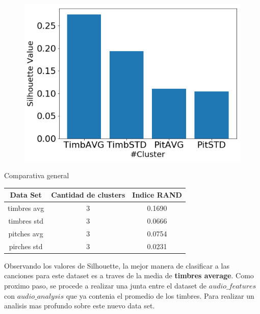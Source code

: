 \begin{figure}[H]
\includegraphics[width=\textwidth]{img/imagenes/jerarquico_AA/silhouette_avgstd.png}
\end{figure}
\begin{center}Comparativa general\end{center}

\begin{table}[H]
	\centering
	\begin{tabular}{ |c|c|c| }
		\hline
 		Data Set & Cantidad de clusters & Indice RAND\\
 		\hline
 		timbres avg & 3 & 0.1690\\
        timbres std & 3 & 0.0666\\
        pitches avg & 3 & 0.0754\\
        pirches std & 3 & 0.0231\\
        \hline
	\end{tabular}
     \label{tab:rand-ds}
\end{table}

Observando los valores de Silhouette, la mejor manera de clasificar a las canciones para este dataset es a traves de la media de \textbf{timbres average}.
Como proximo paso, se procede a realizar una junta entre el dataset de $audio\_features$ con $audio\_analysis$ que ya contenia el promedio de los timbres.
Para realizar un analisis mas profundo sobre este nuevo data set.

